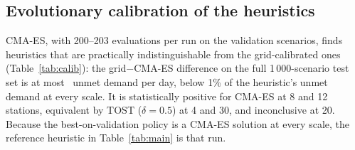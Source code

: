 \documentclass[conference,a4paper]{IEEEtran}
\begin{document}
\subsection{Evolutionary calibration of the heuristics}
CMA-ES, with 200--203 evaluations per run on the validation scenarios, finds heuristics that are practically indistinguishable from the grid-calibrated ones
(Table~\ref{tab:calib}): the grid$-$CMA-ES difference on the full 1\,000-scenario test set is at most \cecCalMaxAbs\ unmet demand per day, below 1\% of the heuristic's
unmet demand at every scale. It is statistically positive for CMA-ES at 8 and 12 stations, equivalent by TOST ($\delta=0.5$) at 4 and 30, and inconclusive at 20.
Because the best-on-validation policy is a CMA-ES solution at every scale, the reference heuristic in Table~\ref{tab:main} is that run.

\begin{table}[t]
\centering\scriptsize\setlength{\tabcolsep}{2.5pt}
\caption{Grid versus CMA-ES calibration, unmet demand per day on the full test set; CMA-ES: mean$\pm$95\% CI over 10 runs; difference = grid $-$ CMA-ES (positive: CMA-ES
better); ``equivalent'': TOST, $\delta=0.5$; ``inconclusive'': CI includes 0 and TOST does not reject.}
\label{tab:calib}

\end{table}
\end{document}
